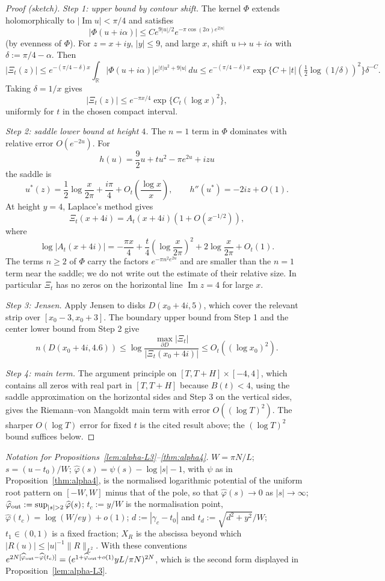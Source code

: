 \documentclass[11pt]{amsart}
\theoremstyle{definition}
\theoremstyle{remark}
\theoremstyle{definition}
\renewcommand{\Im}{\operatorname{Im}}
\newcommand{\R}{\mathbb{R}}
\begin{document}
\begin{proof}[Proof (sketch)]
\emph{Step 1: upper bound by contour shift.}  The kernel $\Phi$ extends holomorphically to
$|\Im u|<\pi/4$ and satisfies
\[
   |\Phi(u+i\alpha)|\le C e^{9|u|/2}e^{-\pi\cos(2\alpha)e^{2|u|}}
\]
(by evenness of $\Phi$).
For $z=x+iy$, $|y|\le9$, and large $x$, shift $u\mapsto u+i\alpha$ with
$\delta:=\pi/4-\alpha$.  Then
\[
   |\Xi_t(z)|
   \le
   e^{-(\pi/4-\delta)x}
   \int_\R |\Phi(u+i\alpha)|e^{|t|u^2+9|u|}\,du
   \le
   e^{-(\pi/4-\delta)x}\exp\{C+|t|(\tfrac12\log(1/\delta))^2\}\delta^{-C}.
\]
Taking $\delta=1/x$ gives
\[
   |\Xi_t(z)|\le e^{-\pi x/4}\exp\{C_t(\log x)^2\},
\]
uniformly for $t$ in the chosen compact interval.

\emph{Step 2: saddle lower bound at height $4$.}  The $n=1$ term in $\Phi$ dominates with relative
error $O(e^{-2u})$.  For
\[
   h(u)=\frac92u+tu^2-\pi e^{2u}+izu
\]
the saddle is
\[
   u^*(z)=\frac12\log\frac{x}{2\pi}+\frac{i\pi}{4}+O_t\!\left(\frac{\log x}{x}\right),
   \qquad
   h''(u^*)=-2iz+O(1).
\]
At height $y=4$, Laplace's method gives
\[
   \Xi_t(x+4i)=A_t(x+4i)(1+O(x^{-1/2})),
\]
where
\[
   \log|A_t(x+4i)|
   =
   -\frac{\pi x}{4}
   +\frac{t}{4}\left(\log\frac{x}{2\pi}\right)^2
   +2\log\frac{x}{2\pi}
   +O_t(1).
\]
The terms $n\ge2$ of $\Phi$ carry the factors $e^{-\pi n^2e^{2u}}$ and are smaller than the
$n=1$ term near the saddle; we do not write out the estimate of their relative size.  In particular
$\Xi_t$ has no zeros on the horizontal line $\Im z=4$ for large $x$.

\emph{Step 3: Jensen.}  Apply Jensen to disks $D(x_0+4i,5)$, which cover the relevant strip over
$[x_0-3,x_0+3]$.  The boundary upper bound from Step 1 and the center lower bound from Step 2 give
\[
   n(D(x_0+4i,4.6))
   \le
   \log\frac{\max_{\partial D}|\Xi_t|}{|\Xi_t(x_0+4i)|}
   \le
   O_t((\log x_0)^2).
\]

\emph{Step 4: main term.}  The argument principle on
$[T,T+H]\times[-4,4]$, which contains all zeros with real part in $[T,T+H]$ because $B(t)<4$, using the saddle approximation on the horizontal sides and Step 3 on the
vertical sides, gives the Riemann--von Mangoldt main term with error $O((\log T)^2)$.  The sharper
$O(\log T)$ error for fixed $t$ is the cited result above; the $(\log T)^2$ bound suffices below.
\end{proof}

\noindent\emph{Notation for Propositions~\ref{lem:alpha-L3}--\ref{thm:alpha4}.}  $W=\pi N/L$;
$s=(u-t_0)/W$; $\widehat\varphi(s)=\psi(s)-\log|s|-1$, with $\psi$ as in
Proposition~\ref{thm:alpha4}, is the normalised logarithmic potential of the uniform root pattern on
$[-W,W]$ minus that of the pole, so that $\widehat\varphi(s)\to0$ as $|s|\to\infty$;
$\widehat\varphi_{\rm out}:=\sup_{|s|>2}\widehat\varphi(s)$; $t_c:=y/W$ is the normalisation point,
$\widehat\varphi(t_c)=\log(W/ey)+o(1)$; $d:=|\gamma_c-t_0|$ and $t_d:=\sqrt{d^2+y^2}/W$; $t_1\in(0,1)$
is a fixed fraction; $X_R$ is the abscissa beyond which $|R(u)|\le|u|^{-1}\|R\|_{L^2}$.  With these
conventions $e^{2N[\widehat\varphi_{\rm out}-\widehat\varphi(t_c)]}=(e^{1+\widehat\varphi_{\rm out}+o(1)}yL/\pi N)^{2N}$,
which is the second form displayed in Proposition~\ref{lem:alpha-L3}.
\end{document}
